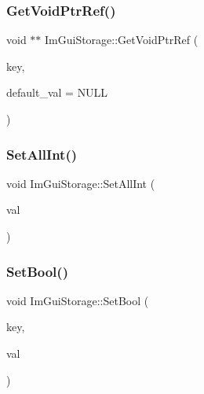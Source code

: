 \hypertarget{struct_im_gui_storage_a2b203317f3f488818e9b9f416fe35332}{}\label{struct_im_gui_storage_a2b203317f3f488818e9b9f416fe35332} 
\subsubsection{\texorpdfstring{Get\+Void\+Ptr\+Ref()}{GetVoidPtrRef()}}
{\footnotesize\ttfamily void $\ast$$\ast$ Im\+Gui\+Storage\+::\+Get\+Void\+Ptr\+Ref (\begin{DoxyParamCaption}\item[{Im\+Gui\+ID}]{key,  }\item[{void $\ast$}]{default\+\_\+val = {\ttfamily NULL} }\end{DoxyParamCaption})}

\hypertarget{struct_im_gui_storage_ae5ee60618c4ce8e2b4ce0e5543d52992}{}\label{struct_im_gui_storage_ae5ee60618c4ce8e2b4ce0e5543d52992} 
\subsubsection{\texorpdfstring{Set\+All\+Int()}{SetAllInt()}}
{\footnotesize\ttfamily void Im\+Gui\+Storage\+::\+Set\+All\+Int (\begin{DoxyParamCaption}\item[{int}]{val }\end{DoxyParamCaption})}

\hypertarget{struct_im_gui_storage_ac5beee31a59b3f5294b41992717be7bf}{}\label{struct_im_gui_storage_ac5beee31a59b3f5294b41992717be7bf} 
\subsubsection{\texorpdfstring{Set\+Bool()}{SetBool()}}
{\footnotesize\ttfamily void Im\+Gui\+Storage\+::\+Set\+Bool (\begin{DoxyParamCaption}\item[{Im\+Gui\+ID}]{key,  }\item[{bool}]{val }\end{DoxyParamCaption})}

